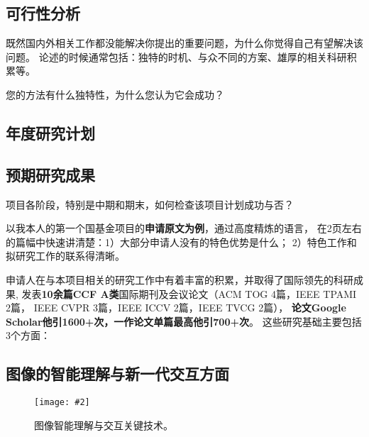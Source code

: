 \documentclass[12pt]{article}
\newcommand{\addImg}[2][1.0]{\texttt{[image: \#2]}}
\newcommand{\myEmph}[1]{\textbf{\textcolor[rgb]{0,0,0.25}{#1}}}
\begin{document}
\subsection{可行性分析}

既然国内外相关工作都没能解决你提出的重要问题，为什么你觉得自己有望解决该问题。
论述的时候通常包括：独特的时机、与众不同的方案、雄厚的相关科研积累等。



您的方法有什么独特性，为什么您认为它会成功？


\subsection{年度研究计划}


\subsection{预期研究成果}

项目各阶段，特别是中期和期末，如何检查该项目计划成功与否？




以我本人的第一个国基金项目的\myEmph{申请原文为例}，通过高度精炼的语言，
在2页左右的篇幅中快速讲清楚：1）大部分申请人没有的特色优势是什么；
2）特色工作和拟研究工作的联系得清晰。

申请人在与本项目相关的研究工作中有着丰富的积累，并取得了国际领先的科研成果, 
发表\myEmph{10余篇CCF A类}国际期刊及会议论文（ACM TOG 4篇，IEEE TPAMI 2篇，
IEEE CVPR 3篇，IEEE ICCV 2篇，IEEE TVCG 2篇），
\myEmph{论文Google Scholar他引1600+次，一作论文单篇最高他引700+次}。
这些研究基础主要包括3个方面：


\subsection{图像的智能理解与新一代交互方面}

\begin{figure}[ht]
    \centering
    \addImg[1]{figures/work.jpg}
    \caption{图像智能理解与交互关键技术。}
    \label{fig:interaction}
\end{figure}
\end{document}

